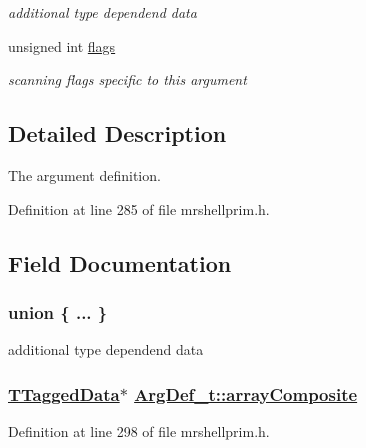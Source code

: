 \begin{CompactItemize}
\begin{tabbing}
\end{tabbing}\begin{CompactList}\small\item\em additional type dependend data \item\end{CompactList}\item 
unsigned int \hyperlink{structArgDef__t_5b37c4058072b47e0392590c26f7d0ca}{flags}
\begin{CompactList}\small\item\em scanning flags specific to this argument \item\end{CompactList}\end{CompactItemize}


\subsection{Detailed Description}
The argument definition. 



Definition at line 285 of file mrshellprim.h.

\subsection{Field Documentation}
\hypertarget{structArgDef__t_b1edabeb6964d6bfde220a6e3f3b5374}{
\subsubsection["@4]{\setlength{\rightskip}{0pt plus 5cm}union \{ ... \} }}
\label{structArgDef__t_b1edabeb6964d6bfde220a6e3f3b5374}


additional type dependend data 

\hypertarget{structArgDef__t_a1d8173daa98a2ba54340e7e6a29db2e}{
\subsubsection[arrayComposite]{\setlength{\rightskip}{0pt plus 5cm}\hyperlink{structTaggedData__t}{TTagged\-Data}$\ast$ \hyperlink{structArgDef__t_a1d8173daa98a2ba54340e7e6a29db2e}{Arg\-Def\_\-t::array\-Composite}}}
\label{structArgDef__t_a1d8173daa98a2ba54340e7e6a29db2e}




Definition at line 298 of file mrshellprim.h.

